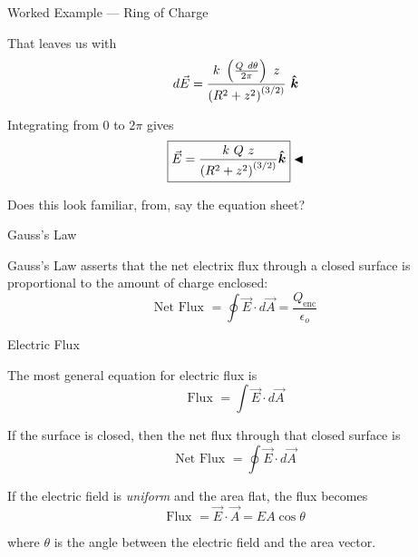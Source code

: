 \documentclass{beamer}
\begin{document}
\begin{frame}{Worked Example --- Ring of Charge}

That leaves us with
\begin{equation*}
    d\vec{E} = \frac{k\ \left( \frac{Q\ d\theta}{2\pi} \right)\ z }{\left( R^2 + z^2 \right)^{(3/2)}}\ \khat
\end{equation*}

Integrating from $0$ to $2\pi$ gives
\begin{equation*}
    \boxed{\vec{E} = \frac{k\ Q\ z}{\left( R^2 + z^2 \right)^{(3/2)}} \khat} \blacktriangleleft
\end{equation*}

Does this look familiar, from, say the equation sheet?

\end{frame}

\begin{frame}{Gauss's Law}

Gauss's Law asserts that the net electrix flux through a closed surface is proportional to the amount of charge enclosed:
\begin{equation*}
	\text{Net Flux } = \oint \vec{E} \cdot d\vec{A} = \frac{Q_{\text{enc}}}{\epsilon_o}
\end{equation*}

\end{frame}

\begin{frame}{Electric Flux}

The most general equation for electric flux is
\begin{equation*}
	\text{Flux } = \int \vec{E} \cdot d\vec{A}
\end{equation*}

If the surface is closed, then the net flux through that closed surface is
\begin{equation*}
	\text{Net Flux } = \oint \vec{E} \cdot d\vec{A}
\end{equation*}

If the electric field is \emph{uniform} and the area flat, the flux becomes
\begin{equation*}
	\text{Flux } = \vec{E} \cdot \vec{A} = EA \cos{\theta}
\end{equation*}

where $\theta$ is the angle between the electric field and the area vector.

\end{frame}
\end{document}
